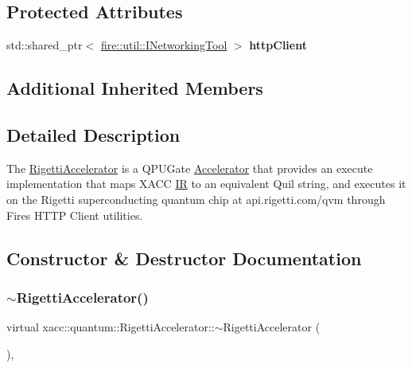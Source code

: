 \subsection*{Protected Attributes}
\begin{DoxyCompactItemize}
\item 
\mbox{\label{a01165_add34bdf35f40e3d00da366795eaa7fcb}} 
std\+::shared\+\_\+ptr$<$ \hyperlink{a01609}{fire\+::util\+::\+I\+Networking\+Tool} $>$ {\bfseries http\+Client}
\end{DoxyCompactItemize}
\subsection*{Additional Inherited Members}


\subsection{Detailed Description}
The \hyperlink{a01165}{Rigetti\+Accelerator} is a Q\+P\+U\+Gate \hyperlink{a01613}{Accelerator} that provides an execute implementation that maps X\+A\+CC \hyperlink{a01677}{IR} to an equivalent Quil string, and executes it on the Rigetti superconducting quantum chip at api.\+rigetti.\+com/qvm through Fire\textquotesingle{}s H\+T\+TP Client utilities. 

\subsection{Constructor \& Destructor Documentation}
\mbox{\label{a01165_a7c86895d1c29afa8b7e18476144a3fcf}} 
\subsubsection{\texorpdfstring{$\sim$\+Rigetti\+Accelerator()}{~RigettiAccelerator()}}
{\footnotesize\ttfamily virtual xacc\+::quantum\+::\+Rigetti\+Accelerator\+::$\sim$\+Rigetti\+Accelerator (\begin{DoxyParamCaption}{ }\end{DoxyParamCaption})\hspace{0.3cm}{\ttfamily [inline]}, {\ttfamily [virtual]}}


